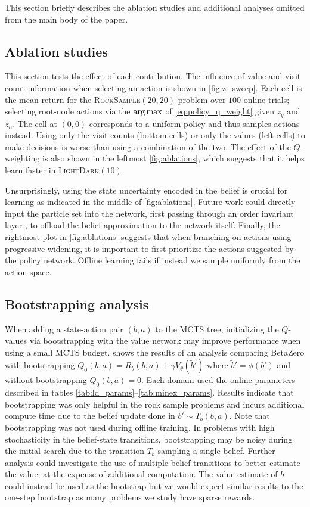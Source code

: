 This section briefly describes the ablation studies and additional analyses omitted from the main body of the paper.

\subsection*{Ablation studies}

This section tests the effect of each contribution.
The influence of value and visit count information when selecting an action is shown in \cref{fig:z_sweep}.
Each cell is the mean return for the \textsc{RockSample}$(20,20)$ problem over $100$ online trials; selecting root-node actions via the $\operatorname*{arg\,max}$ of \cref{eq:policy_q_weight} given $z_q$ and $z_n$.
The cell at $(0,0)$ corresponds to a uniform policy and thus samples actions instead.
Using only the visit counts (bottom cells) or only the values (left cells) to make decisions is worse than using a combination of the two.
The effect of the $Q$-weighting is also shown in the leftmost \cref{fig:ablations}, which suggests that it helps learn faster in \textsc{LightDark}$(10)$.

Unsurprisingly, using the state uncertainty encoded in the belief is crucial for learning as indicated in the middle of \cref{fig:ablations}.
Future work could directly input the particle set into the network, first passing through an order invariant layer \cite{zaheer2017deep}, to offload the belief approximation to the network itself.
Finally, the rightmost plot in \cref{fig:ablations} suggests that when branching on actions using progressive widening, it is important to first prioritize the actions suggested by the policy network.
Offline learning fails if instead we sample uniformly from the action space.


\subsection*{Bootstrapping analysis}

When adding a state-action pair $(b,a)$ to the MCTS tree, initializing the $Q$-values via bootstrapping with the value network may improve performance when using a small MCTS budget.
 shows the results of an analysis comparing BetaZero with bootstrapping $Q_0(b,a) = R_b(b,a) + \gamma V_\theta(\tilde{b}')$ where $\tilde{b}' = \phi(b')$ and without bootstrapping $Q_0(b,a)=0$.
Each domain used the online parameters described in tables \ref{tab:ld_params}--\ref{tab:minex_params}.
Results indicate that bootstrapping was only helpful in the rock sample problems and incurs additional compute time due to the belief update done in $b' \sim T_b(b,a)$.
Note that bootstrapping was not used during offline training.
In problems with high stochasticity in the belief-state transitions, bootstrapping may be noisy during the initial search due to the transition $T_b$ sampling a single belief.
Further analysis could investigate the use of multiple belief transitions to better estimate the value; at the expense of additional computation.
The value estimate of $b$ could instead be used as the bootstrap but we would expect similar results to the one-step bootstrap as many problems we study have sparse rewards.


